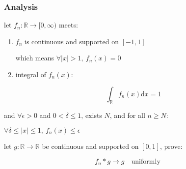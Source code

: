 \subsubsection{Analysis}

\begin{exercise}
    let $f_n: \mathbb{R} \to [0, \infty)$ meets:

    \begin{enumerate}
        \item $f_n$ is continuous and supported on $[-1,1]$

        which means $\forall |x| > 1,\: f_n(x)= 0$
        
        \item integral of $f_n(x)$:

    \[
        \int_{\mathbb{R}} f_n(x) \mathrm{d}x = 1
    \]

    \end{enumerate}


    and $\forall \epsilon > 0$ and $ 0 < \delta \le 1$, exists $N$, and for all $n \ge N$:

$\forall \delta \le |x| \le 1,\: f_n(x) \le \epsilon$

let $g: \mathbb{R} \to \mathbb{R}$ be continuous and supported on $[0,1]$, prove:

\[
    f_n \ast g \to g \quad \mathrm{uniformly}
\]
\end{exercise}

